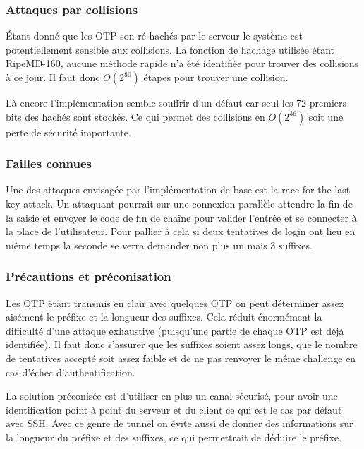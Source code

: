 \documentclass{../res/univ-projet}
\begin{document}
\subsubsection{Attaques par collisions}
        Étant donné que les OTP son ré-hachés par le serveur le système est potentiellement sensible
    aux collisions. La fonction de hachage utilisée étant RipeMD-160, aucune méthode rapide
    n'a été identifiée pour trouver des collisions à ce jour. Il faut donc $O(2^80)$ étapes pour trouver une 
    collision.
    
        Là encore l'implémentation semble souffrir d'un défaut car seul les 72 premiers bits des hachés
    sont stockés. Ce qui permet des collisions en $O(2^36)$ soit une perte de sécurité importante. 

\subsubsection{Failles connues} 
        Une des attaques envisagée par l'implémentation de base est la \og race for the last key attack.\fg{}
    Un attaquant pourrait sur une connexion parallèle attendre la fin de la saisie et envoyer
    le code de fin de chaîne pour valider l'entrée et se connecter à la place de l'utilisateur.
    Pour pallier à cela si deux tentatives de login ont lieu en même temps la seconde se verra demander
    non plus un mais 3 suffixes.

\subsubsection{Précautions et préconisation}
        Les OTP étant transmis en clair avec quelques OTP on peut déterminer assez
    aisément le préfixe et la longueur des suffixes. Cela réduit énormément la
    difficulté d'une attaque exhaustive (puisqu'une partie de chaque OTP est déjà identifiée).
    Il faut donc s'assurer que les suffixes soient assez longs, que le nombre de tentatives accepté
    soit assez faible et de ne pas renvoyer le même challenge en cas d'échec d'authentification.


        La solution préconisée est d'utiliser en plus un canal sécurisé, pour avoir une 
    identification point à point du serveur et du client ce qui est le cas par défaut avec
    SSH. Avec ce genre de tunnel on évite aussi de donner des informations sur la longueur du préfixe
    et des suffixes, ce qui permettrait de déduire le préfixe. %
\end{document}
